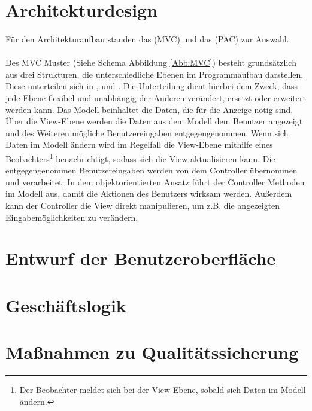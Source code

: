 \section{Architekturdesign}
\paragraph{}
Für den Architekturaufbau standen das  (MVC) und das  (PAC) zur Auswahl.
\paragraph{}
Des MVC Muster (Siehe Schema Abbildung \ref{Abb:MVC}) besteht grundsätzlich aus drei Strukturen, die unterschiedliche Ebenen im Programmaufbau darstellen.
Diese unterteilen sich in ,  und . Die Unterteilung dient hierbei dem Zweck, dass jede Ebene flexibel und unabhängig der Anderen verändert, ersetzt oder erweitert werden kann. 
Das Modell beinhaltet die Daten, die für die Anzeige nötig sind. Über die View-Ebene werden die Daten aus dem Modell dem Benutzer angezeigt und des Weiteren mögliche Benutzereingaben entgegengenommen. Wenn sich Daten im Modell ändern wird im Regelfall die View-Ebene mithilfe eines Beobachters\footnote{Der Beobachter meldet sich bei der View-Ebene, sobald sich Daten im Modell ändern.} benachrichtigt, sodass sich die View aktualisieren kann. Die entgegengenommen Benutzereingaben werden von dem Controller übernommen und verarbeitet. In dem objektorientierten Ansatz führt der Controller Methoden im Modell aus, damit die Aktionen des Benutzers wirksam werden. Außerdem kann der Controller die View direkt manipulieren, um z.B. die angezeigten Eingabemöglichkeiten zu verändern. 
\paragraph{}
 



\section{Entwurf der Benutzeroberfläche}

\section{Geschäftslogik}
\section{Maßnahmen zu Qualitätssicherung}

